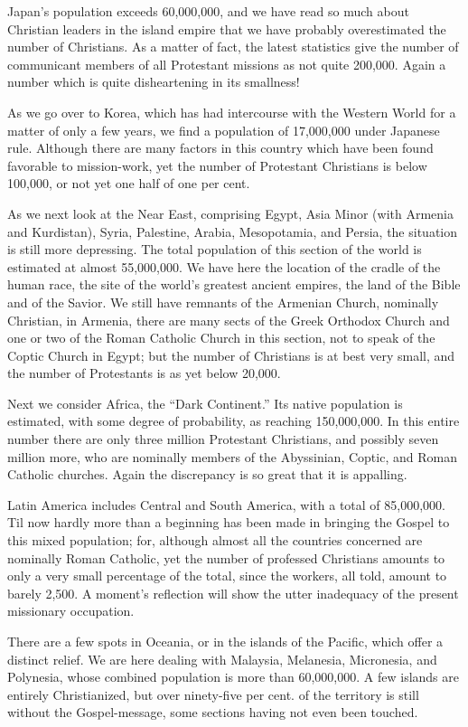 \documentclass[
]{book}
\begin{document}
Japan's population exceeds 60,000,000, and we have read so much about Christian leaders in the island empire that we have probably overestimated the number of Christians. As a matter of fact, the latest statistics give the number of communicant members of all Protestant missions as not quite 200,000. Again a number which is quite disheartening in its smallness!

As we go over to Korea, which has had intercourse with the Western World for a matter of only a few years, we find a population of 17,000,000 under Japanese rule. Although there are many factors in this country which have been found favorable to mission-work, yet the number of Protestant Christians is below 100,000, or not yet one half of one per cent.

As we next look at the Near East, comprising Egypt, Asia Minor (with Armenia and Kurdistan), Syria, Palestine, Arabia, Mesopotamia, and Persia, the situation is still more depressing. The total population of this section of the world is estimated at almost 55,000,000. We have here the location of the cradle of the human race, the site of the world's greatest ancient empires, the land of the Bible and of the Savior. We still have remnants of the Armenian Church, nominally Christian, in Armenia, there are many sects of the Greek Orthodox Church and one or two of the Roman Catholic Church in this section, not to speak of the Coptic Church in Egypt; but the number of Christians is at best very small, and the number of Protestants is as yet below 20,000.

Next we consider Africa, the ``Dark Continent.'' Its native population is estimated, with some degree of probability, as reaching 150,000,000. In this entire number there are only three million Protestant Christians, and possibly seven million more, who are nominally members of the Abyssinian, Coptic, and Roman Catholic churches. Again the discrepancy is so great that it is appalling.

Latin America includes Central and South America, with a total of 85,000,000. Til now hardly more than a beginning has been made in bringing the Gospel to this mixed population; for, although almost all the countries concerned are nominally Roman Catholic, yet the number of professed Christians amounts to only a very small percentage of the total, since the workers, all told, amount to barely 2,500. A moment's reflection will show the utter inadequacy of the present missionary occupation.

There are a few spots in Oceania, or in the islands of the Pacific, which offer a distinct relief. We are here dealing with Malaysia, Melanesia, Micronesia, and Polynesia, whose combined population is more than 60,000,000. A few islands are entirely Christianized, but over ninety-five per cent. of the territory is still without the Gospel-message, some sections having not even been touched.
\end{document}
